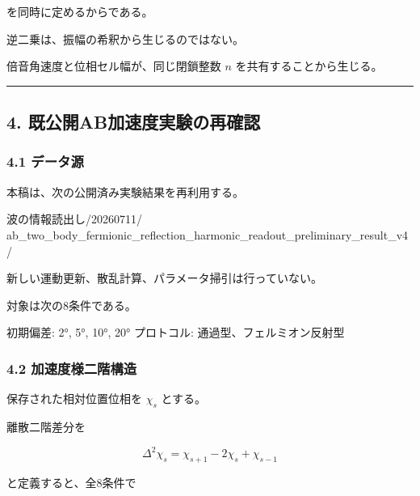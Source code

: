 \documentclass[
  10pt,
  a4paper,
]{ltjsarticle}
\newenvironment{Shaded}{}{}
\newcommand{\NormalTok}[1]{#1}
\begin{document}
を同時に定めるからである。

逆二乗は、振幅の希釈から生じるのではない。

倍音角速度と位相セル幅が、同じ閉鎖整数 \(n\) を共有することから生じる。

\begin{center}\rule{0.5\linewidth}{0.5pt}\end{center}

\subsection{4.
既公開AB加速度実験の再確認}\label{ux65e2ux516cux958babux52a0ux901fux5ea6ux5b9fux9a13ux306eux518dux78baux8a8d}

\subsubsection{4.1 データ源}\label{ux30c7ux30fcux30bfux6e90}

本稿は、次の公開済み実験結果を再利用する。

\begin{Shaded}
\begin{Highlighting}[]
\NormalTok{波の情報読出し/20260711/}
\NormalTok{ab\_two\_body\_fermionic\_reflection\_harmonic\_readout\_preliminary\_result\_v4/}
\end{Highlighting}
\end{Shaded}

新しい運動更新、散乱計算、パラメータ掃引は行っていない。

対象は次の8条件である。

\begin{Shaded}
\begin{Highlighting}[]
\NormalTok{初期偏差: 2°, 5°, 10°, 20°}
\NormalTok{プロトコル: 通過型、フェルミオン反射型}
\end{Highlighting}
\end{Shaded}

\subsubsection{4.2
加速度様二階構造}\label{ux52a0ux901fux5ea6ux69d8ux4e8cux968eux69cbux9020}

保存された相対位置位相を \(\chi_s\) とする。

離散二階差分を

\[
\Delta^2\chi_s
=\chi_{s+1}-2\chi_s+\chi_{s-1}
\]

と定義すると、全8条件で
\end{document}
